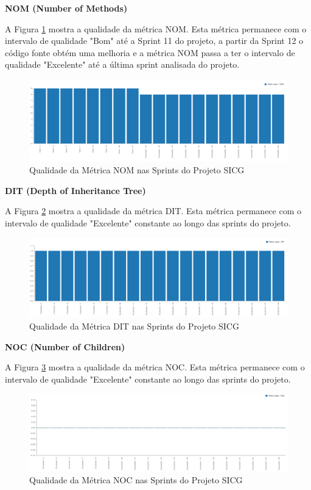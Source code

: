 \textbf{NOM (Number of Methods)} 

A Figura \ref{nom} mostra a qualidade da métrica NOM. Esta métrica permanece com o intervalo de qualidade "Bom" até a Sprint 11 do projeto, a partir da Sprint 12 o código fonte obtém uma melhoria e a métrica NOM passa a ter o intervalo de qualidade "Excelente" até a última sprint analisada do projeto.

\begin{figure}[H]
		\centering
			\includegraphics[scale=0.4]{figuras/nom.png}
		\caption{Qualidade da Métrica NOM nas Sprints do Projeto SICG}
		\label{nom}
\end{figure}

\textbf{DIT (Depth of Inheritance Tree)}

A Figura \ref{dit} mostra a qualidade da métrica DIT. Esta métrica permanece com o intervalo de qualidade "Excelente" constante ao longo das sprints do projeto.

\begin{figure}[H]
		\centering
			\includegraphics[scale=0.4]{figuras/dit.png}
		\caption{Qualidade da Métrica DIT nas Sprints do Projeto SICG}
		\label{dit}
\end{figure}

\textbf{NOC (Number of Children)}

A Figura \ref{noc} mostra a qualidade da métrica NOC. Esta métrica permanece com o intervalo de qualidade "Excelente" constante ao longo das sprints do projeto.

\begin{figure}[H]
		\centering
			\includegraphics[scale=0.4]{figuras/noc.png}
		\caption{Qualidade da Métrica NOC nas Sprints do Projeto SICG}
		\label{noc}
\end{figure}


